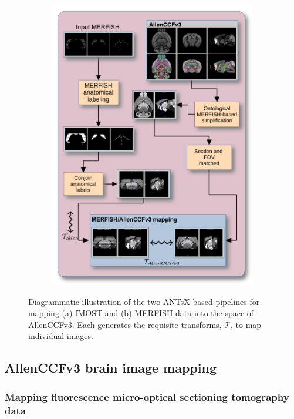 \documentclass[
  12pt,
]{article}
\begin{document}
\begin{figure}
\begin{subfigure}[t]{0.49\textwidth}
\includegraphics[width=0.99\textwidth]{Figures/merfishPipeline.pdf}
\caption{}
\end{subfigure}
\caption{Diagrammatic illustration of the two ANTsX-based pipelines for mapping (a) 
         fMOST and (b) MERFISH data into the space of AllenCCFv3.  Each generates
         the requisite transforms, $\mathcal{T}$, to map individual images.}
\label{fig:allenpipelines}
\end{figure}

\hypertarget{allenccfv3-brain-image-mapping}{%
\subsection{AllenCCFv3 brain image
mapping}\label{allenccfv3-brain-image-mapping}}

\hypertarget{mapping-fluorescence-micro-optical-sectioning-tomography-data}{%
\subsubsection{Mapping fluorescence micro-optical sectioning tomography
data}\label{mapping-fluorescence-micro-optical-sectioning-tomography-data}}
\end{document}
